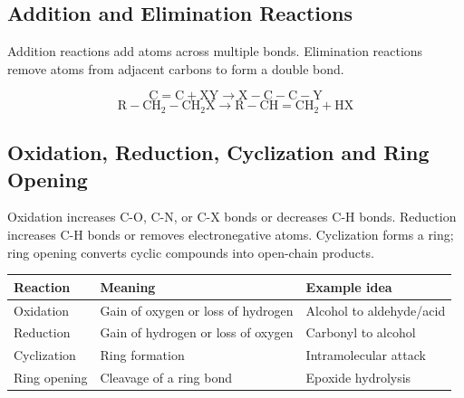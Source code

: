 \documentclass[12pt,a4paper]{article}
\begin{document}
\begin{tcolorbox}[tikzbox, title={SN2 Backside Attack Concept}]
\centering
{}
\end{tcolorbox}

\subsection{Addition and Elimination Reactions}
Addition reactions add atoms across multiple bonds. Elimination reactions remove atoms from adjacent carbons to form a double bond.

\begin{tcolorbox}[formulabox, title={Typical Patterns}]
\[
\mathrm{C=C + XY \rightarrow X-C-C-Y}
\]
\[
\mathrm{R-CH_2-CH_2X \rightarrow R-CH=CH_2 + HX}
\]
\end{tcolorbox}

\subsection{Oxidation, Reduction, Cyclization and Ring Opening}
Oxidation increases C-O, C-N, or C-X bonds or decreases C-H bonds. Reduction increases C-H bonds or removes electronegative atoms. Cyclization forms a ring; ring opening converts cyclic compounds into open-chain products.

\begin{tabularx}{\linewidth}{|B{3cm}|Y|Y|}
\hline
\textbf{Reaction} & \textbf{Meaning} & \textbf{Example idea} \\
\hline
Oxidation & Gain of oxygen or loss of hydrogen & Alcohol to aldehyde/acid \\
\hline
Reduction & Gain of hydrogen or loss of oxygen & Carbonyl to alcohol \\
\hline
Cyclization & Ring formation & Intramolecular attack \\
\hline
Ring opening & Cleavage of a ring bond & Epoxide hydrolysis \\
\hline
\end{tabularx}
\end{document}
